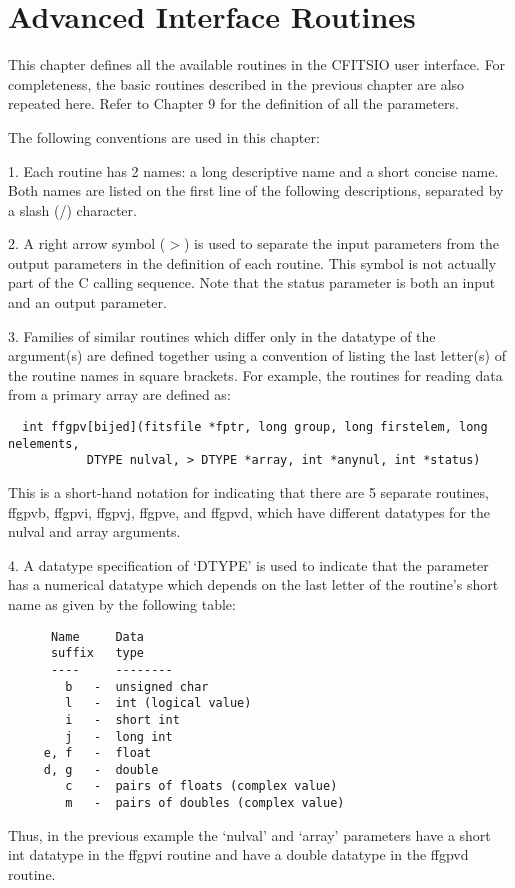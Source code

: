 \chapter{   Advanced Interface Routines }

This chapter defines all the available routines in the CFITSIO user
interface.  For completeness, the basic routines
described in the previous chapter are also repeated here.
Refer to Chapter 9 for the definition of all the parameters.

The following conventions are used in this chapter:

1. Each routine has 2 names: a long descriptive
name and a short concise name.  Both names are listed on the first
line of the following descriptions, separated by a slash (/) character.

2. A right arrow symbol ($>$) is used to separate the input parameters from
the output parameters in the  definition of each routine.  This symbol
is not actually part of the C calling sequence.  Note that
the status parameter is both an input and an output parameter.

3. Families of similar routines which differ only in the datatype
of the argument(s) are defined together using a convention
of listing the last letter(s) of the routine names in square brackets.
For example, the routines for reading data from a primary array
are defined as:

\begin{verbatim}
  int ffgpv[bijed](fitsfile *fptr, long group, long firstelem, long nelements,
           DTYPE nulval, > DTYPE *array, int *anynul, int *status)
\end{verbatim}
This is a short-hand notation for indicating that there are 5
separate routines, ffgpvb, ffgpvi, ffgpvj, ffgpve, and ffgpvd,
which have different datatypes for the nulval and array arguments.

4. A datatype specification of `DTYPE' is used to indicate
that the parameter has a numerical datatype which depends on the last
letter of the routine's short name as given by the following table:

\begin{verbatim}
      Name     Data
      suffix   type
      ----     --------
        b   -  unsigned char
        l   -  int (logical value)
        i   -  short int
        j   -  long int
     e, f   -  float
     d, g   -  double
        c   -  pairs of floats (complex value)
        m   -  pairs of doubles (complex value)
\end{verbatim}
Thus, in the previous example the `nulval' and `array'  parameters have
a short int datatype in the ffgpvi routine and have a
double datatype in the ffgpvd routine.


